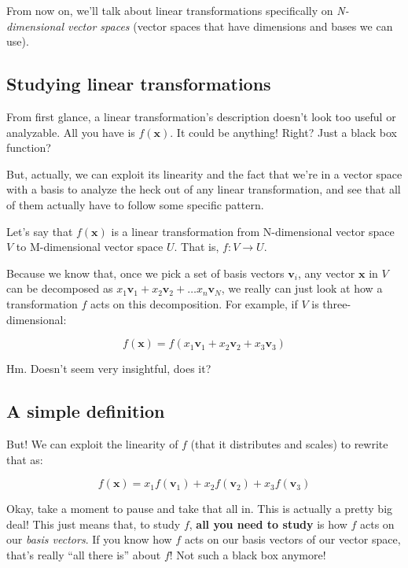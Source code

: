 \documentclass[]{article}
\begin{document}
From now on, we'll talk about linear transformations specifically on
\emph{N-dimensional vector spaces} (vector spaces that have dimensions and bases
we can use).

\subsection{Studying linear
transformations}\label{studying-linear-transformations}

From first glance, a linear transformation's description doesn't look too useful
or analyzable. All you have is \(f(\mathbf{x})\). It could be anything! Right?
Just a black box function?

But, actually, we can exploit its linearity and the fact that we're in a vector
space with a basis to analyze the heck out of any linear transformation, and see
that all of them actually have to follow some specific pattern.

Let's say that \(f(\mathbf{x})\) is a linear transformation from N-dimensional
vector space \(V\) to M-dimensional vector space \(U\). That is, \(f : V
\rightarrow U\).

Because we know that, once we pick a set of basis vectors \(\mathbf{v}_i\), any
vector \(\mathbf{x}\) in \(V\) can be decomposed as \(x_1 \mathbf{v}_1 + x_2
\mathbf{v}_2 + \ldots x_n \mathbf{v}_N\), we really can just look at how a
transformation \(f\) acts on this decomposition. For example, if \(V\) is
three-dimensional:

\[
f(\mathbf{x}) = f(x_1 \mathbf{v}_1 + x_2 \mathbf{v}_2 + x_3 \mathbf{v}_3)
\]

Hm. Doesn't seem very insightful, does it?

\subsection{A simple definition}\label{a-simple-definition}

But! We can exploit the linearity of \(f\) (that it distributes and scales) to
rewrite that as:

\[
f(\mathbf{x}) = x_1 f(\mathbf{v}_1) + x_2 f(\mathbf{v}_2) + x_3 f(\mathbf{v}_3)
\]

Okay, take a moment to pause and take that all in. This is actually a pretty big
deal! This just means that, to study \(f\), \textbf{all you need to study} is
how \(f\) acts on our \emph{basis vectors}. If you know how \(f\) acts on our
basis vectors of our vector space, that's really ``all there is'' about \(f\)!
Not such a black box anymore!
\end{document}
